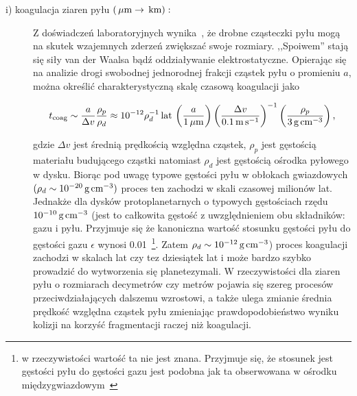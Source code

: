 \begin{description}
   \item[i) koagulacja ziaren pyłu $\left(\hbox{$\thinspace\mu\textrm{m}$} \rightarrow \hbox{$\thinspace\textrm{km}$}\right):$] 
      Z doświadczeń laboratoryjnych wynika~\cite{BW08}, że drob\-ne cząsteczki pyłu
      mogą na skutek wzajemnych zderzeń zwiększać swoje rozmiary. ,,Spoiwem'' stają
      się siły van der Waalsa bądź oddziaływanie elektrostatyczne. Opierając się
      na analizie drogi swobodnej jednorodnej frakcji cząstek pyłu o promieniu
      $a$, można określić charakterystyczną skalę czasową koagulacji jako 

   \begin{equation}\label{coag} 
      t_{\textrm{coag}} %
      \sim \frac{a}{\Delta v}\frac{\rho_p}{\rho_d} \approx 
      10^{-12} \rho_d^{-1}\yr\thinspace
      \left(\frac{a}{1\mum}\right)
      \left(\frac{\Delta v}{0.1\m\s^{-1}}\right)^{-1}
      \left(\frac{\rho_p}{3\g\cm^{-3}}\right),
   \end{equation}

   gdzie $\Delta v$ jest średnią prędkością względna cząstek, $\rho_p$ jest
   gęstością materiału budującego cząstki natomiast $\rho_d$ jest gęstością
   ośrodka pyłowego w dysku.  Biorąc pod uwagę typowe gęstości pyłu w obłokach
   gwiazdowych $(\rho_d \sim 10^{-20}\hbox{$\thinspace\textrm{g}$}\hbox{$\thinspace\textrm{cm}$}^{-3})$ proces ten zachodzi w skali
   czasowej milionów lat. Jednakże dla dysków protoplanetarnych o typowych
   gęstościach rzędu $10^{-10}\hbox{$\thinspace\textrm{g}$}\hbox{$\thinspace\textrm{cm}$}^{-3}$ (jest to całkowita gęstość z
   uwzględnieniem obu składników: gazu i pyłu. Przyjmuje się że kanoniczna
   wartość stosunku gęstości pyłu do gęstości gazu $\epsilon$ wynosi
   0.01~\footnote{w rzeczywistości wartość ta nie jest znana. Przyjmuje się, że
   stosunek jest gęstości pyłu do gęstości gazu jest podobna jak ta obserwowana
   w ośrodku międzygwiazdowym~\cite{FS03}}. Zatem $\rho_d \sim
   10^{-12}\hbox{$\thinspace\textrm{g}$}\hbox{$\thinspace\textrm{cm}$}^{-3}$) proces koagulacji zachodzi w skalach lat czy tez
  dziesiątek lat i może bardzo szybko prowadzić do wytworzenia się
   planetezymali. W rzeczywistości dla ziaren pyłu o rozmiarach decymetrów czy
   metrów pojawia się szereg procesów przeciwdziałających dalszemu wzrostowi, a
   także ulega zmianie średnia prędkość względna cząstek pyłu zmieniając
   prawdopodobieństwo wyniku kolizji na korzyść fragmentacji raczej niż
   koagulacji.  


\end{description}
